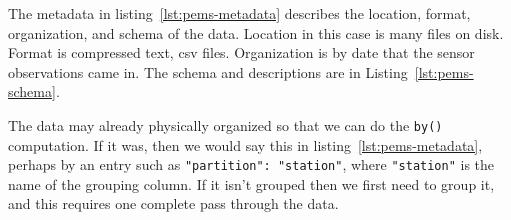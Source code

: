 The metadata in listing~\ref{lst:pems-metadata} describes the location, format, organization, and schema of the data.
Location in this case is many files on disk.
Format is compressed text, csv files.
Organization is by date that the sensor observations came in.
The schema and descriptions are in Listing~\ref{lst:pems-schema}.





The data may already physically organized so that we can do the \texttt{by()} computation.
If it was, then we would say this in listing~\ref{lst:pems-metadata}, perhaps by an entry such as \texttt{"partition": "station"}, where \texttt{"station"} is the name of the grouping column.
If it isn't grouped then we first need to group it, and this requires one complete pass through the data.
